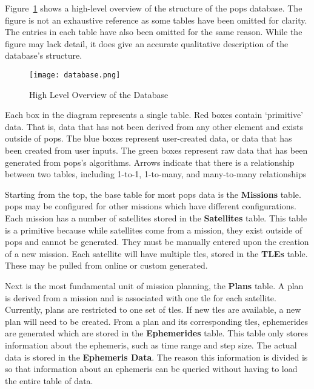 Figure~\ref{fig:database} shows a high-level overview of the structure of the
\gls{pops} database. The figure is not an exhaustive reference as some tables
have been omitted for clarity. The entries in each table have also been
omitted for the same reason. While the figure may lack detail, it does give an
accurate qualitative description of the database's structure. 

\begin{figure}
    \centering
    \texttt{[image: database.png]} 
    \caption{High Level Overview of the Database}
    \label{fig:database} 
\end{figure}

Each box in the diagram represents a single table. Red boxes contain
`primitive' data. That is, data that has not been derived from any other
element and exists outside of \gls{pops}. The blue boxes represent user-created
data, or data that has been created from user inputs. The green boxes represent
raw data that has been generated from \gls{pops}'s algorithms. Arrows indicate
that there is a relationship between two tables, including 1-to-1, 1-to-many,
and many-to-many relationships

Starting from the top, the base table for most \gls{pops} data is the
\textbf{Missions} table. \gls{pops} may be configured for other missions which
have different configurations. Each mission has a number of satellites stored
in the \textbf{Satellites} table. This table is a primitive because while
satellites come from a mission, they exist outside of \gls{pops} and cannot be
generated. They must be manually entered upon the creation of a new mission.
Each satellite will have multiple \glspl{tle}, stored in the \textbf{TLEs}
table. These may be pulled from online or custom generated.

Next is the most fundamental unit of mission planning, the \textbf{Plans}
table. A plan is derived from a mission and is associated with one \gls{tle}
for each satellite. Currently, plans are restricted to one set of \glspl{tle}.
If new \glspl{tle} are available, a new plan will need to be created.  From a
plan and its corresponding \glspl{tle}, ephemerides are generated which are
stored in the \textbf{Ephemerides} table. This table only stores information
about the ephemeris, such as time range and step size. The actual data is
stored in the \textbf{Ephemeris Data}. The reason this information is divided
is so that information about an ephemeris can be queried without having to load
the entire table of data.

